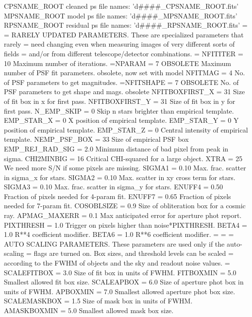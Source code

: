 {{CPSNAME\_ROOT               cleaned  ps file names: 'd\#\#\#\#\_CPSNAME\_ROOT.fits'
MPSNAME\_ROOT               model    ps file names: 'd\#\#\#\#\_MPSNAME\_ROOT.fits'
RPSNAME\_ROOT               residual ps file names: 'd\#\#\#\#\_RPSNAME\_ROOT.fits'
=
=  RARELY UPDATED PARAMETERS.  These are specialized parameters that rarely
=  need changing even when measuring images of very different sorts of fields
=  and/or from different telescope/detector combinations.
=
NFITITER = 10          Maximum number of iterations.
=NPARAM = 7            OBSOLETE Maximum number of PSF fit parameters. obsolete, now set with model
NFITMAG = 4            No. of PSF parameters to get magnitudes.
=NFITSHAPE = 7         OBSOLETE No. of PSF parameters to get shape and mags.  obsolete
NFITBOXFIRST\_X = 31    Size of fit box in x for first pass.
NFITBOXFIRST\_Y = 31    Size of fit box in y for first pass.
N\_EMP\_SKIP = 0         Skip n stars brighter than empirical template.
EMP\_STAR\_X = 0         X position of empirical template.
EMP\_STAR\_Y = 0         Y position of empirical template.
EMP\_STAR\_Z = 0         Central intensity of empirical template.
NEMP\_PSF\_BOX = 33      Size of empirical PSF box
EMP\_REJ\_RAD\_SIG = 2.0  Minimum distance of bad pixel from peak in sigma.
CHI2MINBIG = 16        Critical CHI-squared for a large object.
XTRA = 25              We need more S/N if some pixels are missing.
SIGMA1 = 0.10          Max. frac. scatter in sigma\_x for stars.
SIGMA2 = 0.10          Max. scatter in xy cross term for stars.
SIGMA3 = 0.10          Max. frac. scatter in sigma\_y for stars.
ENUFF4 = 0.50          Fraction of pixels needed for 4-param fit.
ENUFF7 = 0.65          Fraction of pixels needed for 7-param fit.
COSOBLSIZE = 0.9       Size of obliteration box for a cosmic ray.
APMAG\_MAXERR = 0.1     Max anticipated error for aperture phot report.
PIXTHRESH = 1.0        Trigger on pixels higher than noise*PIXTHRESH.
BETA4 = 1.0            R**4 coefficient modifier.
BETA6 = 1.0            R**6 coefficient modifier.
=
=
=  AUTO SCALING PARAMETERS.  These parameters are used only if the auto-scaling
=  flags are turned on.  Box sizes, and threshold levels can be scaled 
=  according to the FWHM of objects and the sky and readout noise values.
=
SCALEFITBOX = 3.0      Size of fit box in units of FWHM.
FITBOXMIN = 5.0        Smallest allowed fit box size.
SCALEAPBOX = 6.0       Size of aperture phot box in units of FWHM.
APBOXMIN = 7.0         Smallest allowed aperture phot box size.
SCALEMASKBOX = 1.5     Size of mask box in units of FWHM.
AMASKBOXMIN = 5.0      Smallest allowed mask box size.
}}

